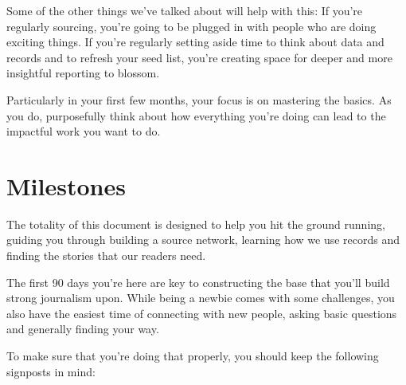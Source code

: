 \documentclass[
  11pt,
  american,
  letterpaperpaper,
  extrafontsizes,onecolumn,openright
  ]{memoir}
\begin{document}
Some of the other things we've talked about will help with this: If you're regularly sourcing, you're going to be plugged in with people who are doing exciting things. If you're regularly setting aside time to think about data and records and to refresh your seed list, you're creating space for deeper and more insightful reporting to blossom.

Particularly in your first few months, your focus is on mastering the basics. As you do, purposefully think about how everything you're doing can lead to the impactful work you want to do.

\hypertarget{milestones}{%
\chapter{Milestones}\label{milestones}}

The totality of this document is designed to help you hit the ground running, guiding you through building a source network, learning how we use records and finding the stories that our readers need.

The first 90 days you're here are key to constructing the base that you'll build strong journalism upon. While being a newbie comes with some challenges, you also have the easiest time of connecting with new people, asking basic questions and generally finding your way.

To make sure that you're doing that properly, you should keep the following signposts in mind:
\end{document}
